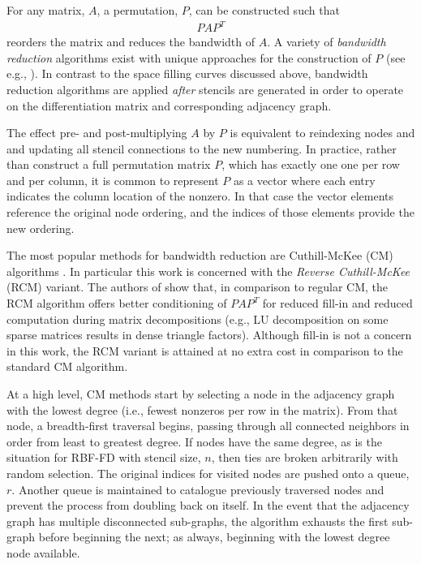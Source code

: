 \documentclass{report}
\begin{document}
For any matrix, $A$, a permutation, $P$, can be constructed such that 
\begin{align*}
P A P^T
\end{align*}
reorders the matrix and reduces the bandwidth of $A$. A variety of \emph{bandwidth reduction} algorithms exist with unique approaches for the construction of $P$ (see e.g., \cite{Gibbs1976, LiuSherman1976, MellorCrummey2001}).  In contrast to the space filling curves discussed above, bandwidth reduction algorithms are applied \emph{after} stencils are generated in order to operate on the differentiation matrix and corresponding adjacency graph. 

The effect pre- and post-multiplying $A$ by $P$ is equivalent to reindexing nodes and and updating all stencil connections to the new numbering. In practice, rather than construct a full permutation matrix $P$, which has exactly one one per row and per column, it is common to represent $P$ as a vector where each entry indicates the column location of the nonzero. In that case the vector elements reference the original node ordering, and the indices of those elements provide the new ordering. 

The most popular methods for bandwidth reduction are Cuthill-McKee (CM) algorithms \cite{Cuthill1969, LiuSherman1976}. In particular this work is concerned with the \emph{Reverse Cuthill-McKee} (RCM) variant. The authors of \cite{LiuSherman1976} show that, in comparison to regular CM, the RCM algorithm offers better conditioning of $PAP^T$ for reduced fill-in and reduced computation during matrix decompositions (e.g., LU decomposition on some sparse matrices results in dense triangle factors). Although fill-in is not a concern in this work, the RCM variant is attained at no extra cost in comparison to the standard CM algorithm.

At a high level, CM methods start by selecting a node in the adjacency graph with the lowest degree (i.e., fewest nonzeros per row in the matrix). From that node, a breadth-first traversal begins, passing through all connected neighbors in order from least to greatest degree. If nodes have the same degree, as is the situation for RBF-FD with stencil size, $n$, then ties are broken arbitrarily with random selection. The original indices for visited nodes are pushed onto a queue, $r$. Another queue is maintained to catalogue previously traversed nodes and prevent the process from doubling back on itself. In the event that the adjacency graph has multiple disconnected sub-graphs, the algorithm exhausts the first sub-graph before beginning the next; as always, beginning with the lowest degree node available. 
\end{document}
